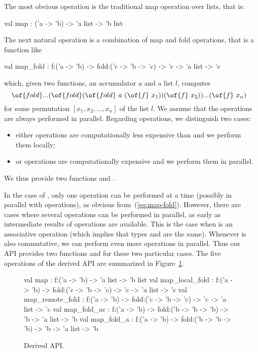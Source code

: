 \documentclass[tfpsymp,pagenumbers]{tfp07symp}
\begin{document}
The most obvious operation is the traditional map operation over
lists, that is:
\begin{ocaml}
  val map : ('a -> 'b) -> 'a list -> 'b list
\end{ocaml}
The next natural operation is a combination of map and fold
operations, that is a function like
\begin{ocaml}
 val map_fold : f:('a -> 'b) -> fold:('c -> 'b -> 'c) -> 'c -> 'a list -> 'c
\end{ocaml}
which, given two functions, an accumulator $a$ and a list $l$, computes
\begin{equation}\label{eq:map-fold}
  \of{fold} ... (\of{fold} (\of{fold} ~ a ~ (\of{f} ~ x_1)) (\of{f} ~ x_2))
  ... (\of{f} ~ x_n)
\end{equation}
for some permutation $[x_1,x_2,...,x_n]$ of the list $l$.
We assume that the  operations are always performed in parallel.
Regarding  operations, we distinguish two cases:
\begin{itemize}
\item either  operations are computationally less expensive
  than  and we perform them locally;
\item or  operations are computationally expensive and we
  perform them in parallel.
\end{itemize}
We thus provide two functions  and .

In the case of , only one  operation can
be performed at a time (possibly in parallel with 
operations), as obvious from~(\ref{eq:map-fold}). However, there are
cases where several  operations can be performed in parallel,
as early as intermediate results of  operations are available.
This is the case when  is an associative operation (which
implies that types  and  are the same).
Whenever
 is also commutative, we can perform even more 
operations in parallel. Thus our API provides two functions
 and  for these two particular cases.
The five operations of the derived API are summarized
in Figure~\ref{fig:derived}.
\begin{figure}[t]
  \begin{ocaml}
    val map : 
      f:('a -> 'b) -> 'a list -> 'b list 
    val map_local_fold : 
      f:('a -> 'b) -> fold:('c -> 'b -> 'c) -> 
      'c -> 'a list -> 'c 
    val map_remote_fold : 
      f:('a -> 'b) -> fold:('c -> 'b -> 'c) -> 
      'c -> 'a list -> 'c 
    val map_fold_ac : 
      f:('a -> 'b) -> fold:('b -> 'b -> 'b) -> 
      'b -> 'a list -> 'b 
    val map_fold_a : 
      f:('a -> 'b) -> fold:('b -> 'b -> 'b) -> 
      'b -> 'a list -> 'b
  \end{ocaml}
  \caption{Derived API.}
\label{fig:derived}
\end{figure}
\end{document}
